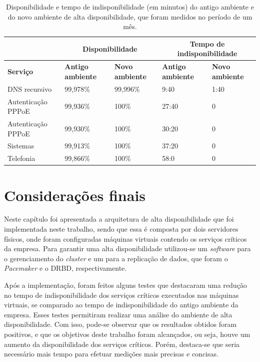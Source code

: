 \begin{table}[h!]
\caption{Disponibilidade e tempo de indisponibilidade (em minutos) do antigo ambiente e do novo ambiente de alta disponibilidade, que foram medidos no período de um mês.}
\small
\label{tab:testefinal}
\begin{center}
\begin{tabular}{|l|p{2cm}|p{2cm}|p{2cm}|p{2cm}|}\hline
 & \multicolumn{2}{|c|}{\textbf{Disponibilidade}} & \multicolumn{2}{|c|}{\textbf{Tempo de indisponibilidade}} \\\hline
\textbf{Serviço} & \textbf{Antigo ambiente} & \textbf{Novo ambiente} & \textbf{Antigo ambiente} & \textbf{Novo ambiente} \\\hline
DNS recursivo & 99,978\% & 99,996\% & 9:40 & 1:40 \\\hline
Autenticação \ac{PPPoE} & 99,936\% & 100\% & 27:40 & 0 \\\hline
Autenticação \ac{PPPoE} & 99,930\% & 100\% & 30:20 & 0 \\\hline
Sistemas & 99,913\% & 100\% & 37:20 & 0 \\\hline
Telefonia & 99,866\% & 100\% & 58:0 & 0 \\\hline
\end{tabular}
\end{center}
\end{table}


\section{Considerações finais}

Neste capítulo foi apresentada a arquitetura de alta disponibilidade que foi implementada neste trabalho, sendo que essa é composta por dois 
servidores físicos, onde foram configuradas máquinas virtuais contendo os serviços críticos da empresa. Para garantir uma alta disponibilidade
utilizou-se um \textit{software} para o gerenciamento do \textit{cluster} e um para a replicação de dados, que foram o \textit{Pacemaker} e o 
\ac{DRBD}, respectivamente.

Após a implementação, foram feitos alguns testes que destacaram uma redução no tempo de indisponibilidade dos serviços 
críticos executados nas máquinas virtuais, se comparado ao tempo de indisponibilidade do antigo ambiente da empresa. 
Esses testes permitiram realizar uma análise do ambiente de alta disponibilidade.
Com isso, pode-se observar que os resultados obtidos foram positivos, e que os objetivos deste trabalho foram alcançados, ou seja, houve um 
aumento da disponibilidade dos serviços críticos. Porém, destaca-se que seria necessário mais tempo para efetuar medições mais precisas e concisas.


